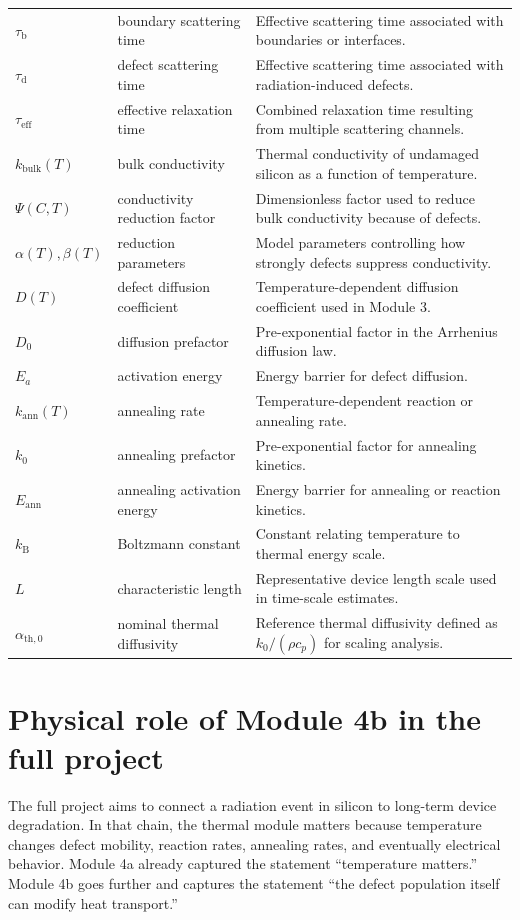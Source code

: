 \documentclass[11pt]{article}
\newcommand{\kB}{k_{\mathrm{B}}}
\begin{document}
\begin{longtable}{p{} p{} p{}}
$\tau_{\mathrm{b}}$ & boundary scattering time & Effective scattering time associated with boundaries or interfaces. \\
$\tau_{\mathrm{d}}$ & defect scattering time & Effective scattering time associated with radiation-induced defects. \\
$\tau_{\mathrm{eff}}$ & effective relaxation time & Combined relaxation time resulting from multiple scattering channels. \\
$k_{\mathrm{bulk}}(T)$ & bulk conductivity & Thermal conductivity of undamaged silicon as a function of temperature. \\
$\Psi(C,T)$ & conductivity reduction factor & Dimensionless factor used to reduce bulk conductivity because of defects. \\
$\alpha(T),\beta(T)$ & reduction parameters & Model parameters controlling how strongly defects suppress conductivity. \\
$D(T)$ & defect diffusion coefficient & Temperature-dependent diffusion coefficient used in Module 3. \\
$D_0$ & diffusion prefactor & Pre-exponential factor in the Arrhenius diffusion law. \\
$E_a$ & activation energy & Energy barrier for defect diffusion. \\
$k_{\mathrm{ann}}(T)$ & annealing rate & Temperature-dependent reaction or annealing rate. \\
$k_0$ & annealing prefactor & Pre-exponential factor for annealing kinetics. \\
$E_{\mathrm{ann}}$ & annealing activation energy & Energy barrier for annealing or reaction kinetics. \\
$\kB$ & Boltzmann constant & Constant relating temperature to thermal energy scale. \\
$L$ & characteristic length & Representative device length scale used in time-scale estimates. \\
$\alpha_{\mathrm{th},0}$ & nominal thermal diffusivity & Reference thermal diffusivity defined as $k_0/(\rho c_p)$ for scaling analysis. \\
\bottomrule
\end{longtable}

\section{Physical role of Module 4b in the full project}

The full project aims to connect a radiation event in silicon to long-term device degradation. In that chain, the thermal module matters because temperature changes defect mobility, reaction rates, annealing rates, and eventually electrical behavior. Module 4a already captured the statement ``temperature matters.'' Module 4b goes further and captures the statement ``the defect population itself can modify heat transport.''
\end{document}
